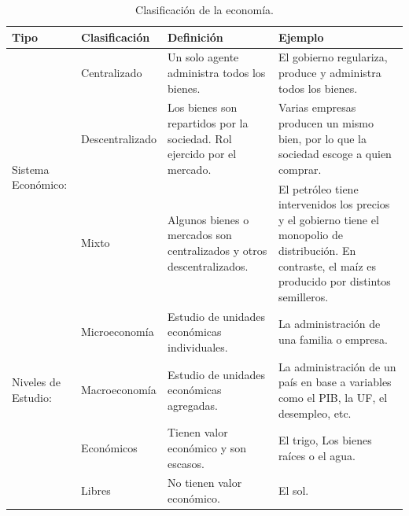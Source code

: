\documentclass[
  letterpaper,
  DIV=11,
  numbers=noendperiod]{scrreport}
\begin{document}
\begin{table}[htb]
    \centering
    \begin{tabular}{|p{20mm}|p{30mm}|p{45mm}|p{45mm}|}
        \hline
        Tipo & Clasificación & Definición & Ejemplo \\ \hline
        \multirow{3}{3cm}{Sistema Económico:} & Centralizado & \hspace{2mm} Un solo agente administra todos los bienes. & \hspace{2mm} El gobierno regulariza, produce y administra todos los bienes.\\ \cline{2-4}
        & Descentralizado & \hspace{2mm} Los bienes son repartidos por la sociedad. Rol ejercido por el mercado. & \hspace{2mm} Varias empresas producen un mismo bien, por lo que la sociedad escoge a quien comprar.\\ \cline{2-4}
        & Mixto & \hspace{2mm} Algunos bienes o mercados son centralizados y otros descentralizados. & \hspace{2mm} El petróleo tiene intervenidos los precios y el gobierno tiene el monopolio de distribución. En contraste, el maíz es producido por distintos semilleros.\\ \cline{1-4}
        \multirow{3}{3cm}{Niveles de Estudio:} & Microeconomía & \hspace{2mm} Estudio de unidades económicas individuales. & \hspace{2mm} La administración de una familia o empresa. \\ \cline{2-4}
        & Macroeconomía & \hspace{2mm} Estudio de unidades económicas agregadas. & \hspace{2mm} La administración de un país en base a variables como el PIB, la UF, el desempleo, etc. \\ \cline{1-4}
        \multirow{3}{3cm}{Recursos:} & Económicos & \hspace{2mm} Tienen valor económico y son escasos. & \hspace{2mm} El trigo, Los bienes raíces o el agua. \\ \cline{2-4}
        & Libres & \hspace{2mm} No tienen valor económico. & \hspace{2mm} El sol. \\ \cline{1-4}
    \end{tabular}
    \caption{Clasificación de la economía.}
    \label{tabla:final}
\end{table}
\end{document}
